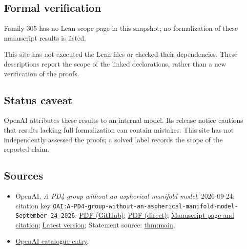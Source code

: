 \documentclass[11pt]{article}
\begin{document}
\subsection{Formal verification}
Family 305 has no Lean scope page in this snapshot; no formalization of these manuscript results is listed.

This site has not executed the Lean files or checked their dependencies. These descriptions report the scope of the linked declarations, rather than a new verification of the proofs.

\subsection{Status caveat}
OpenAI attributes these results to an internal model. Its release notice cautions that results lacking full formalization can contain mistakes. This site has not independently assessed the proofs; a solved label records the scope of the reported claim.

\subsection{Sources}
\begin{itemize}
\item OpenAI, \emph{A PD4 group without an aspherical manifold model}, 2026-09-24; citation key \texttt{OAI:A-PD4-group-without-an-aspherical-manifold-model-September-24-2026}. \href{https://github.com/openai/math/blob/adc7f1241b42e322a6451854ab7e4b4c146bf78a/preprints/A-PD4-group-without-an-aspherical-manifold-model-September-24-2026/paper.pdf}{PDF (GitHub)}; \href{https://github.com/openai/math/raw/adc7f1241b42e322a6451854ab7e4b4c146bf78a/preprints/A-PD4-group-without-an-aspherical-manifold-model-September-24-2026/paper.pdf}{PDF (direct)}; \href{https://github.com/openai/math/blob/adc7f1241b42e322a6451854ab7e4b4c146bf78a/preprints/A-PD4-group-without-an-aspherical-manifold-model-September-24-2026/README.md}{Manuscript page and citation}; \href{https://github.com/openai/math/blob/main/preprints/A-PD4-group-without-an-aspherical-manifold-model-September-24-2026/paper.pdf}{Latest version}; Statement source: \href{https://github.com/openai/math/blob/adc7f1241b42e322a6451854ab7e4b4c146bf78a/preprints/A-PD4-group-without-an-aspherical-manifold-model-September-24-2026/build/paper.tex\#L94}{thm:main}.
\item \href{https://github.com/openai/math/blob/adc7f1241b42e322a6451854ab7e4b4c146bf78a/CONTENTS.md}{OpenAI catalogue entry}.
\end{itemize}
\end{document}
